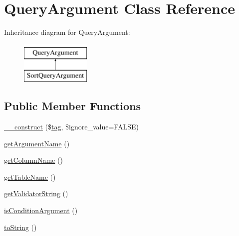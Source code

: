 \hypertarget{classQueryArgument}{\section{Query\-Argument Class Reference}
\label{classQueryArgument}
}
Inheritance diagram for Query\-Argument\-:\begin{figure}[H]
\begin{center}
\leavevmode
\includegraphics[height=2.000000cm]{classQueryArgument}
\end{center}
\end{figure}
\subsection*{Public Member Functions}
\begin{DoxyCompactItemize}
\item 
\hyperlink{classQueryArgument_af41efe90c5cdcb60dfe1c5cfb7b99ec5}{\-\_\-\-\_\-construct} (\$\hyperlink{classtag}{tag}, \$ignore\-\_\-value=F\-A\-L\-S\-E)
\item 
\hyperlink{classQueryArgument_a01a5627882c4034551e0c22daed811bd}{get\-Argument\-Name} ()
\item 
\hyperlink{classQueryArgument_aa0ee6b3b56a5c9de48fe073f84f818bc}{get\-Column\-Name} ()
\item 
\hyperlink{classQueryArgument_a0cd81646f06d0b3d8ed92977498fd7aa}{get\-Table\-Name} ()
\item 
\hyperlink{classQueryArgument_a457e607f0cc0ec072e00f0bc5c3898fd}{get\-Validator\-String} ()
\item 
\hyperlink{classQueryArgument_af45c774e9b260c62bfa0a4a9e8e5b10d}{is\-Condition\-Argument} ()
\item 
\hyperlink{classQueryArgument_a659504bbccf960ab47afeac6c4e7a30a}{to\-String} ()
\end{DoxyCompactItemize}
